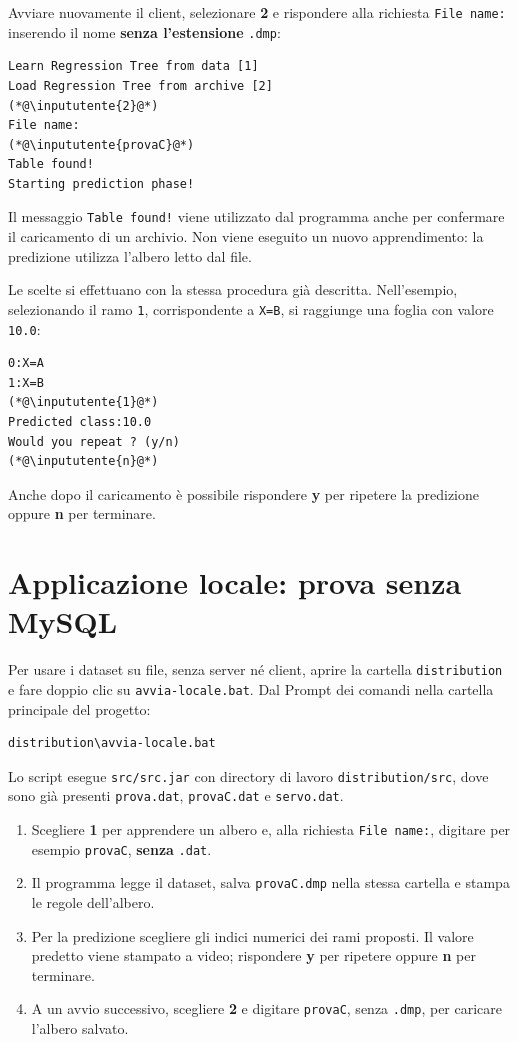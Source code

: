 \documentclass[11pt,a4paper]{article}
\begin{document}
Avviare nuovamente il client, selezionare \textbf{2} e rispondere alla richiesta
\texttt{File name:} inserendo il nome \textbf{senza l'estensione}
\texttt{.dmp}:

\begin{lstlisting}
Learn Regression Tree from data [1]
Load Regression Tree from archive [2]
(*@\inpututente{2}@*)
File name:
(*@\inpututente{provaC}@*)
Table found!
Starting prediction phase!
\end{lstlisting}

Il messaggio \texttt{Table found!} viene utilizzato dal programma anche per
confermare il caricamento di un archivio. Non viene eseguito un nuovo
apprendimento: la predizione utilizza l'albero letto dal file.

Le scelte si effettuano con la stessa procedura già descritta. Nell'esempio,
selezionando il ramo \texttt{1}, corrispondente a \texttt{X=B}, si raggiunge
una foglia con valore \texttt{10.0}:

\begin{lstlisting}
0:X=A
1:X=B
(*@\inpututente{1}@*)
Predicted class:10.0
Would you repeat ? (y/n)
(*@\inpututente{n}@*)
\end{lstlisting}

Anche dopo il caricamento è possibile rispondere \textbf{y} per ripetere la
predizione oppure \textbf{n} per terminare.

\clearpage
\section*{Applicazione locale: prova senza MySQL}

Per usare i dataset su file, senza server né client, aprire la cartella
\texttt{distribution} e fare doppio clic su \texttt{avvia-locale.bat}.
Dal Prompt dei comandi nella cartella principale del progetto:
\begin{lstlisting}
distribution\avvia-locale.bat
\end{lstlisting}

Lo script esegue \texttt{src/src.jar} con directory di lavoro
\texttt{distribution/src}, dove sono già presenti \texttt{prova.dat},
\texttt{provaC.dat} e \texttt{servo.dat}.

\begin{enumerate}
  \item Scegliere \textbf{1} per apprendere un albero e, alla richiesta
        \texttt{File name:}, digitare per esempio \texttt{provaC},
        \textbf{senza} \texttt{.dat}.
  \item Il programma legge il dataset, salva \texttt{provaC.dmp} nella stessa
        cartella e stampa le regole dell'albero.
  \item Per la predizione scegliere gli indici numerici dei rami proposti.
        Il valore predetto viene stampato a video; rispondere \textbf{y} per
        ripetere oppure \textbf{n} per terminare.
  \item A un avvio successivo, scegliere \textbf{2} e digitare
        \texttt{provaC}, senza \texttt{.dmp}, per caricare l'albero salvato.
\end{enumerate}
\end{document}
